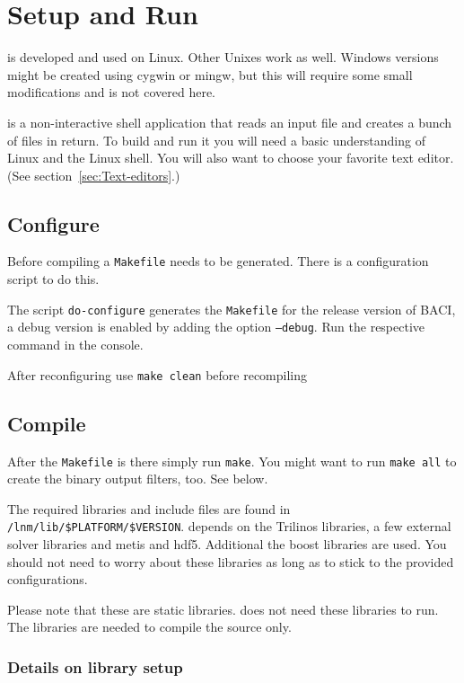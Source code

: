 \section{Setup and Run}

\ccarat{} is developed and used on Linux. Other Unixes work as well.
Windows versions might be created using cygwin or mingw, but this
will require some small modifications and is not covered here.

\ccarat{} is a non-interactive shell application that reads an input
file and creates a bunch of files in return. To build and run it you
will need a basic understanding of Linux and the Linux shell. You
will also want to choose your favorite text editor. (See section~\ref{sec:Text-editors}.)


\subsection{Configure}

Before compiling a \texttt{Makefile} needs to be generated. There
is a configuration script to do this.

The script \texttt{do-configure} generates the \texttt{Makefile} for
the release version of BACI, a debug version is enabled by adding the
option \texttt{--debug}. Run the respective command in the console.

After reconfiguring use \texttt{make clean} before recompiling

\subsection{Compile}

After the \texttt{Makefile} is there simply run \texttt{make}. You
might want to run \texttt{make all} to create the binary output filters,
too. See below.

The required libraries and include files are found in \texttt{/lnm/lib/\$PLATFORM/\$VERSION}.
\ccarat{} depends on the Trilinos libraries, a few external solver
libraries and metis and hdf5. Additional the boost libraries are used.
You should not need to worry about these libraries
as long as to stick to the provided configurations.

Please note that these are static libraries. \ccarat{} does not need
these libraries to run. The libraries are needed to compile the source
only.


\subsubsection{Details on library setup}

